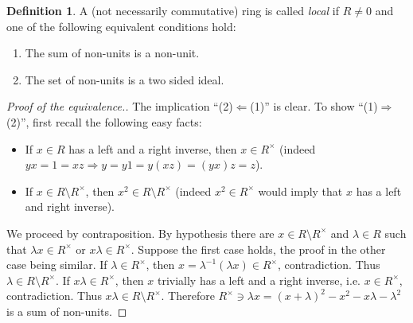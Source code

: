 \documentclass[12pt,a4paper]{report}
\theoremstyle{definition}
\newtheorem{defn}[theorem]{Definition}
\theoremstyle{num.custom-title}
\DeclareMathOperator{\imp}{\Rightarrow}
\DeclareMathOperator{\pmi}{\Leftarrow}
\DeclareMathOperator{\sm}{\setminus}
\begin{document}
\begin{defn}\label{def-local_ring}
A (not necessarily commutative) ring is called \emph{local} if $R \neq 0$ and one of the following equivalent conditions hold:
\begin{enumerate}
\item The sum of non-units is a non-unit.
\item The set of non-units is a two sided ideal.
\end{enumerate}
\begin{proof}[Proof of the equivalence.]
The implication ``(2)$\pmi$(1)'' is clear. To show ``(1)$\imp$(2)'', first recall the following easy facts:
\begin{itemize}
\item If $x \in R$ has a left and a right inverse, then $x \in R^\times$ (indeed $yx=1=xz \imp y=y1=y(xz)=(yx)z=z$).
\item If $x \in R \sm R^\times$, then $x^2 \in R \sm R^\times$ (indeed $x^2 \in R^\times$ would imply that $x$ has a left and right inverse).
\end{itemize}
We proceed by contraposition. By hypothesis there are $x \in R \sm R^\times$ and $\lambda \in R$ such that $\lambda x \in R^\times$ or $x \lambda \in R^\times$. Suppose the first case holds, the proof in the other case being similar. If $\lambda \in R^\times$, then $x = \lambda^{-1} (\lambda x) \in R^\times$, contradiction. Thus $\lambda \in R \sm R^\times$. If $x \lambda \in R^\times$, then $x$ trivially has a left and a right inverse, i.e. $x \in R^\times$, contradiction. Thus $x \lambda \in R \sm R^\times$. Therefore $R^\times \ni \lambda x = (x+\lambda)^2-x^2-x\lambda-\lambda^2$ is a sum of non-units.
\end{proof}
\end{defn}
\end{document}

